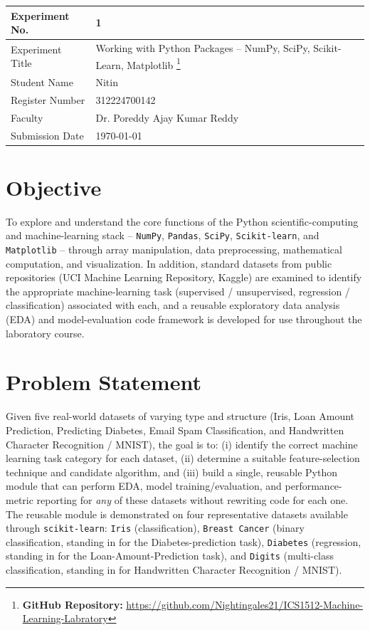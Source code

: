 \documentclass[12pt,a4paper]{article}
\DeclareRobustCommand{\_}{\textunderscore\allowbreak}
\begin{document}
\noindent\begin{tabular}{|p{4cm}|p{\dimexpr\linewidth-4cm-4\tabcolsep-3\arrayrulewidth\relax}|}
\hline
Experiment No. & 1 \\ \hline
Experiment Title & Working with Python Packages -- NumPy, SciPy, Scikit-Learn, Matplotlib
\footnote{\textbf{GitHub Repository: }\url{https://github.com/Nightingales21/ICS1512-Machine-Learning-Labratory}}\\ \hline
Student Name & Nitin \\ \hline
Register Number & 312224700142 \\ \hline
Faculty & Dr. Poreddy Ajay Kumar Reddy \\ \hline
Submission Date & \today \\ \hline
\end{tabular}

\section{Objective}
To explore and understand the core functions of the Python scientific-computing and
machine-learning stack -- \texttt{NumPy}, \texttt{Pandas}, \texttt{SciPy},
\texttt{Scikit-learn}, and \texttt{Matplotlib} -- through array manipulation, data
preprocessing, mathematical computation, and visualization. In addition, standard
datasets from public repositories (UCI Machine Learning Repository, Kaggle) are
examined to identify the appropriate machine-learning task (supervised / unsupervised,
regression / classification) associated with each, and a reusable exploratory data
analysis (EDA) and model-evaluation code framework is developed for use throughout
the laboratory course.

\section{Problem Statement}
Given five real-world datasets of varying type and structure (Iris, Loan Amount
Prediction, Predicting Diabetes, Email Spam Classification, and Handwritten
Character Recognition / MNIST), the goal is to: (i) identify the correct machine
learning task category for each dataset, (ii) determine a suitable feature-selection
technique and candidate algorithm, and (iii) build a single, reusable Python module
that can perform EDA, model training/evaluation, and performance-metric reporting
for \emph{any} of these datasets without rewriting code for each one. The reusable
module is demonstrated on four representative datasets available through
\texttt{scikit-learn}: \texttt{Iris} (classification), \texttt{Breast Cancer}
(binary classification, standing in for the Diabetes-prediction task),
\texttt{Diabetes} (regression, standing in for the Loan-Amount-Prediction task),
and \texttt{Digits} (multi-class classification, standing in for Handwritten
Character Recognition / MNIST).
\end{document}
